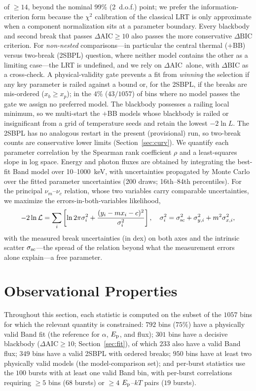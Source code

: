 \documentclass[twocolumn]{aastex631}
\newcommand{\nuc}{\ensuremath{\nu_c}}
\newcommand{\num}{\ensuremath{\nu_m}}
\newcommand{\Ep}{\ensuremath{E_{\rm p}}}
\newcommand{\kT}{\ensuremath{kT}}
\newcommand{\daic}{\ensuremath{\Delta\mathrm{AIC}}}
\newcommand{\ssc}{\ensuremath{\sigma_{\rm sc}}}
\begin{document}
\citep{Wilks1938} of $\ge$$14$, beyond the nominal 99\% (2~d.o.f.) point; we
prefer the information-criterion form because the $\chi^2$ calibration of the
classical LRT is only approximate when a component normalization sits at a
parameter boundary. Every blackbody and second break that passes $\daic\ge10$
also passes the more conservative $\Delta\mathrm{BIC}$ criterion. For
\emph{non-nested} comparisons---in particular the central thermal
($+$BB) versus two-break (2SBPL) question, where neither model contains the
other as a limiting case---the LRT is undefined, and we rely
on \daic\ alone, with $\Delta\mathrm{BIC}$ as a cross-check. A physical-validity
gate prevents a fit from \emph{winning} the selection if any key parameter is
railed against a bound or, for the 2SBPL, if the breaks are mis-ordered
($x_b\ge x_p$); in the $4\%$ ($43/1057$) of bins where no model passes the gate
we assign no preferred model. The blackbody possesses a railing local minimum,
so we multi-start the $+$BB models whose blackbody is railed or insignificant
from a grid of temperature seeds and retain the lowest $-2\ln L$. The 2SBPL has
no analogous restart in the present (provisional) run, so two-break counts are
conservative lower limits (Section~\ref{sec:curv}). We quantify each parameter
correlation by the Spearman rank coefficient $\rho$ and a least-squares slope in
log space. Energy and photon fluxes are obtained by integrating the best-fit
Band model over 10--1000~keV, with uncertainties propagated by Monte Carlo over
the fitted parameter uncertainties (200 draws; 16th--84th percentiles). For the
principal $\num$--$\nuc$ relation, whose two variables carry comparable
uncertainties, we maximize the \citet{DAgostini2005} errors-in-both-variables
likelihood,
\begin{equation}
-2\ln\mathcal{L}=\sum_i\left[\ln 2\pi\sigma_i^2
+\frac{(y_i-m x_i-c)^2}{\sigma_i^2}\right],\quad
\sigma_i^2=\ssc^2+\sigma_{y,i}^2+m^2\sigma_{x,i}^2,
\label{eq:dagostini}
\end{equation}
with the measured break uncertainties (in dex) on both axes and the intrinsic
scatter \ssc---the spread of the relation beyond what the measurement errors
alone explain---a free parameter.

\section{Observational Properties} \label{sec:obs}
Throughout this section, each statistic is computed on the subset of the
$1057$ bins for which the relevant quantity is constrained: $792$ bins
($75\%$) have a physically valid Band fit (the reference for $\alpha$, \Ep,
and flux); $301$ bins have a decisive blackbody ($\daic\ge10$;
Section~\ref{sec:fit}), of which $233$ also have a valid Band flux; $349$ bins
have a valid 2SBPL with ordered breaks; $950$ bins have at least two
physically valid models (the model-comparison set); and per-burst statistics
use the $100$ bursts with at least one valid Band bin, with per-burst
correlations requiring $\ge$$5$ bins ($68$ bursts) or $\ge$$4$
$\Ep$--$\kT$ pairs ($19$ bursts).
\end{document}
